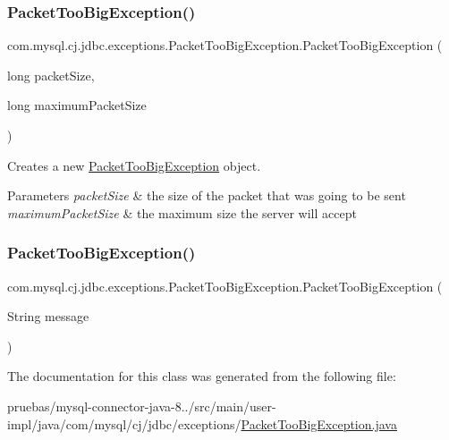 \subsubsection{\texorpdfstring{Packet\+Too\+Big\+Exception()}{PacketTooBigException()}\hspace{0.1cm}{\footnotesize\ttfamily [1/2]}}
{\footnotesize\ttfamily com.\+mysql.\+cj.\+jdbc.\+exceptions.\+Packet\+Too\+Big\+Exception.\+Packet\+Too\+Big\+Exception (\begin{DoxyParamCaption}\item[{long}]{packet\+Size,  }\item[{long}]{maximum\+Packet\+Size }\end{DoxyParamCaption})}

Creates a new \mbox{\hyperlink{classcom_1_1mysql_1_1cj_1_1jdbc_1_1exceptions_1_1_packet_too_big_exception}{Packet\+Too\+Big\+Exception}} object.


\begin{DoxyParams}{Parameters}
{\em packet\+Size} & the size of the packet that was going to be sent \\
\hline
{\em maximum\+Packet\+Size} & the maximum size the server will accept \\
\hline
\end{DoxyParams}
\mbox{\label{classcom_1_1mysql_1_1cj_1_1jdbc_1_1exceptions_1_1_packet_too_big_exception_a41b9ee069f0dab7d92c1ff0be161f0fd}} 
\subsubsection{\texorpdfstring{Packet\+Too\+Big\+Exception()}{PacketTooBigException()}\hspace{0.1cm}{\footnotesize\ttfamily [2/2]}}
{\footnotesize\ttfamily com.\+mysql.\+cj.\+jdbc.\+exceptions.\+Packet\+Too\+Big\+Exception.\+Packet\+Too\+Big\+Exception (\begin{DoxyParamCaption}\item[{String}]{message }\end{DoxyParamCaption})}



The documentation for this class was generated from the following file\+:\begin{DoxyCompactItemize}
\item 
pruebas/mysql-\/connector-\/java-\/8../src/main/user-\/impl/java/com/mysql/cj/jdbc/exceptions/\mbox{\hyperlink{_packet_too_big_exception_8java}{Packet\+Too\+Big\+Exception.\+java}}\end{DoxyCompactItemize}
